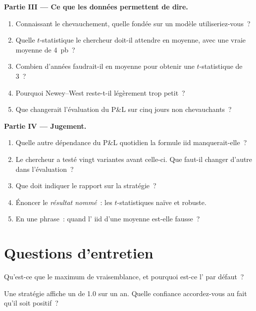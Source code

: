 \begin{problem}
\medskip\noindent\textbf{Partie III --- Ce que les données permettent de dire.}
\begin{enumerate}[resume]
\item Connaissant le chevauchement, quelle  fondée sur un modèle utiliseriez-vous~?
\item Quelle $t$-statistique le chercheur doit-il attendre en moyenne, avec une vraie moyenne de 4~pb~?
\item Combien d'années faudrait-il en moyenne pour obtenir une $t$-statistique de 3~?
\item Pourquoi Newey--West reste-t-il légèrement trop petit~?
\item Que changerait l'évaluation du P\&L sur cinq jours non chevauchants~?
\end{enumerate}

\medskip\noindent\textbf{Partie IV --- Jugement.}
\begin{enumerate}[resume]
\item Quelle autre dépendance du P\&L quotidien la formule iid manquerait-elle~?
\item Le chercheur a testé vingt variantes avant celle-ci. Que faut-il changer d'autre dans l'évaluation~?
\item Que doit indiquer le rapport sur la stratégie~?
\item Énoncer le \emph{résultat nommé}~: les $t$-statistiques naïve et robuste.
\item En une phrase~: quand l' iid d'une moyenne est-elle fausse~?
\end{enumerate}
\end{problem}

\section{Questions d'entretien}

\begin{interviewq}\label{iq:qm:estimation:1}
Qu'est-ce que le maximum de vraisemblance, et pourquoi est-ce l' par défaut~?
\end{interviewq}

\begin{interviewq}\label{iq:qm:estimation:2}
Une stratégie affiche un  de 1.0 sur un an. Quelle confiance accordez-vous au fait qu'il soit positif~?
\end{interviewq}

